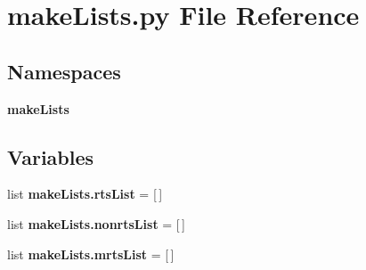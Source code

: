 \section{make\+Lists.\+py File Reference}
\label{make_lists_8py}
\subsection*{Namespaces}
\begin{DoxyCompactItemize}
\item 
 \textbf{ make\+Lists}
\end{DoxyCompactItemize}
\subsection*{Variables}
\begin{DoxyCompactItemize}
\item 
list \textbf{ make\+Lists.\+rts\+List} = [$\,$]
\item 
list \textbf{ make\+Lists.\+nonrts\+List} = [$\,$]
\item 
list \textbf{ make\+Lists.\+mrts\+List} = [$\,$]
\end{DoxyCompactItemize}
